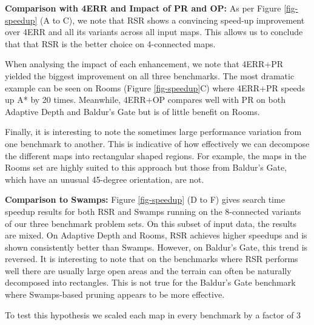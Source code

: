 \par
\textbf{Comparison with 4ERR and Impact of PR and OP:}
As per Figure \ref{fig-speedup} (A to C), we note that RSR shows a convincing 
speed-up improvement over 4ERR and all its variants across all input maps.
This allows us to conclude that that RSR is the better choice on 4-connected maps.
\par
When analysing the impact of each enhancement, we note that 4ERR+PR yielded the
biggest improvement on all three benchmarks.
The most dramatic example can be seen on Rooms (Figure \ref{fig-speedup}C) 
where 4ERR+PR speeds up A* by 20 times.
Meanwhile, 4ERR+OP compares well with PR on both Adaptive Depth and
Baldur's Gate but is of little benefit on Rooms.
\par
Finally, it is interesting to note the sometimes large performance variation 
from one benchmark to another. This is indicative of how effectively we can 
decompose the different maps into rectangular shaped regions.
For example, the maps in the Rooms set are highly suited to this approach but those
from Baldur's Gate, which have an unusual 45-degree orientation, are not.
\par
\textbf{Comparison to Swamps:}
Figure \ref{fig-speedup} (D to F) gives search time speedup results for both RSR
and Swamps running on the 8-connected variants of our three benchmark problem
sets. On this subset of input data, the results are mixed.
On Adaptive Depth and Rooms, RSR achieves higher
speedups and is shown consistently better than Swamps. However, on Baldur's
Gate, this trend is reversed.  
It is interesting to note that on the
benchmarks where RSR performs well there are usually large open areas and the
terrain can often be naturally decomposed into rectangles.  This is not
true for the Baldur's Gate benchmark where Swamps-based pruning appears to be
more effective.
\par
To test this hypothesis we scaled each map in every benchmark by a factor of 3
